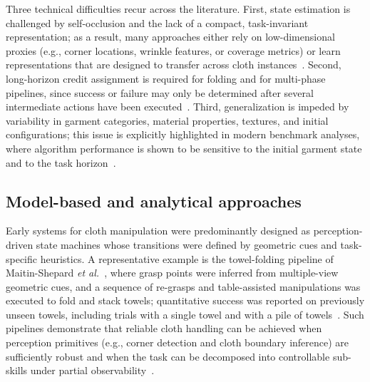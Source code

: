 Three technical difficulties recur across the literature. First, state estimation is challenged by self-occlusion and the lack of a compact, task-invariant representation; as a result, many approaches either rely on low-dimensional proxies (e.g., corner locations, wrinkle features, or coverage metrics) or learn representations that are designed to transfer across cloth instances~\cite{Sanchez2018DeformableSurvey,Gu2023DeformableSurvey}. Second, long-horizon credit assignment is required for folding and for multi-phase pipelines, since success or failure may only be determined after several intermediate actions have been executed~\cite{Longhini2025ClothReview,Lu2024GarmentLab}. Third, generalization is impeded by variability in garment categories, material properties, textures, and initial configurations; this issue is explicitly highlighted in modern benchmark analyses, where algorithm performance is shown to be sensitive to the initial garment state and to the task horizon~\cite{Lu2024GarmentLab,Gu2023DeformableSurvey}.

\subsection{Model-based and analytical approaches}

Early systems for cloth manipulation were predominantly designed as perception-driven state machines whose transitions were defined by geometric cues and task-specific heuristics. A representative example is the towel-folding pipeline of Maitin-Shepard \emph{et al.}~\cite{MaitinShepard2010ClothGrasp}, where grasp points were inferred from multiple-view geometric cues, and a sequence of re-grasps and table-assisted manipulations was executed to fold and stack towels; quantitative success was reported on previously unseen towels, including trials with a single towel and with a pile of towels~\cite{MaitinShepard2010ClothGrasp}. Such pipelines demonstrate that reliable cloth handling can be achieved when perception primitives (e.g., corner detection and cloth boundary inference) are sufficiently robust and when the task can be decomposed into controllable sub-skills under partial observability~\cite{MaitinShepard2010ClothGrasp,Longhini2025ClothReview}.


